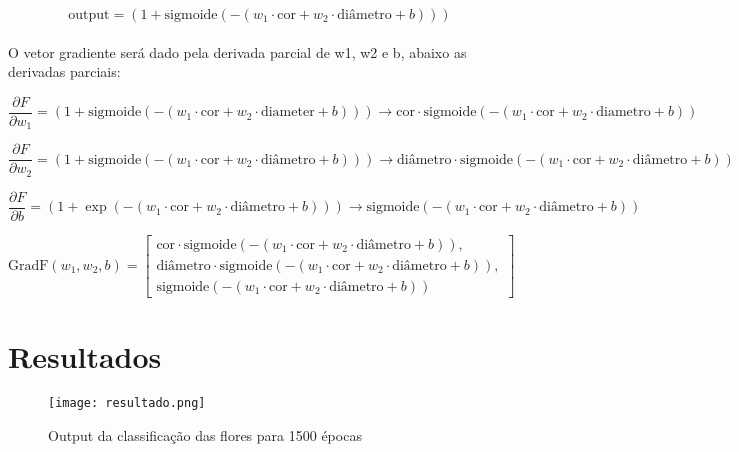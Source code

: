 \documentclass[12pt]{article}
\begin{document}
\begin{equation}
\text{output} = \left(1 + \text{sigmoide}\left(-\left(w_1 \cdot \text{cor} + w_2 \cdot \text{diâmetro} + b\right)\right)\right)
\end{equation}\\
O vetor gradiente será dado pela derivada parcial de w1, w2 e b, abaixo as derivadas parciais:

\begin{equation}
\frac{\partial F}{\partial w_1} = (1 + \text{sigmoide}(-(w_1 \cdot \text{cor} + w_2 \cdot \text{diameter} + b))) \rightarrow \text{cor} \cdot \text{sigmoide}(-(w_1 \cdot \text{cor} + w_2 \cdot \text{diametro} + b))
\end{equation}

\begin{equation}
\frac{\partial F}{\partial w_2} = (1 + \text{sigmoide}(-(w_1 \cdot \text{cor} + w_2 \cdot \text{diâmetro} + b))) \rightarrow \text{diâmetro} \cdot \text{sigmoide} (-(w_1 \cdot \text{cor} + w_2 \cdot \text{diâmetro} + b))
\end{equation}

\begin{equation}
\frac{\partial F}{\partial b} = (1 + \exp(-(w_1 \cdot \text{cor} + w_2 \cdot \text{diâmetro} + b))) \rightarrow \text{sigmoide} (-(w_1 \cdot \text{cor} + w_2 \cdot \text{diâmetro} + b))
\end{equation}

\begin{equation}
\text{GradF}(w_1, w_2, b) = \left[ \begin{array}{c}
\text{cor} \cdot \text{sigmoide}(-(w_1 \cdot \text{cor} + w_2 \cdot \text{diâmetro} + b)), \\
\text{diâmetro} \cdot \text{sigmoide}(-(w_1 \cdot \text{cor} + w_2 \cdot \text{diâmetro} + b)), \\
\text{sigmoide}(-(w_1 \cdot \text{cor} + w_2 \cdot \text{diâmetro} + b))
\end{array} \right]
\end{equation}

\section{Resultados}

\begin{figure}[H]
  \centering
  \texttt{[image: resultado.png]}
  \caption{Output da classificação das flores para 1500 épocas}
\end{figure}
\end{document}
